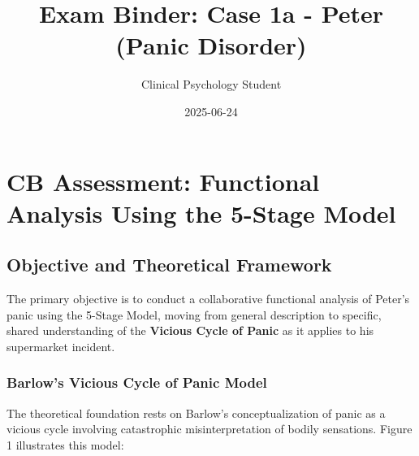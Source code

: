 \documentclass[
  american,
  letterpaper,
  DIV=11,
  numbers=noendperiod]{scrartcl}
\title{Exam Binder: Case 1a - Peter (Panic Disorder)}
\author{Clinical Psychology Student}
\date{2025-06-24}
\begin{document}
\maketitle


\newpage

\section{CB Assessment: Functional Analysis Using the 5-Stage
Model}\label{cb-assessment-functional-analysis-using-the-5-stage-model}

\subsection{Objective and Theoretical
Framework}\label{objective-and-theoretical-framework}

The primary objective is to conduct a collaborative functional analysis
of Peter's panic using the 5-Stage Model, moving from general
description to specific, shared understanding of the \textbf{Vicious
Cycle of Panic} as it applies to his supermarket incident.

\subsubsection{Barlow's Vicious Cycle of Panic
Model}\label{barlows-vicious-cycle-of-panic-model}

The theoretical foundation rests on Barlow's conceptualization of panic
as a vicious cycle involving catastrophic misinterpretation of bodily
sensations. Figure 1 illustrates this model:
\end{document}

